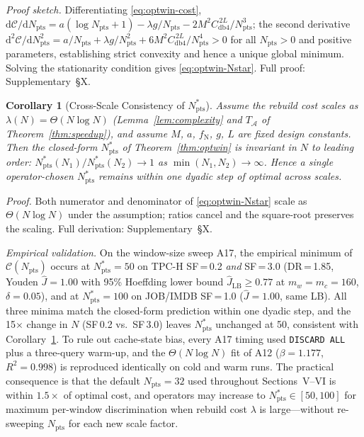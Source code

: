 \documentclass[10pt,twocolumn,a4paper]{article}
\newtheorem{corollary}{Corollary}
\newcommand{\Nstar}{N^{*}_{\mathrm{pts}}}
\newcommand{\Npts}{N_{\mathrm{pts}}}
\begin{document}
\noindent\textit{Proof sketch.} Differentiating \eqref{eq:optwin-cost},
$\mathrm{d}\mathcal{C}/\mathrm{d}\Npts\!=\!a(\log \Npts\!+\!1)\!-\!\lambda g/\Npts\!-\!2M^{2}C_{\mathrm{db4}}^{\,2L}\!/\Npts^{3}$;
the second derivative
$\mathrm{d}^{2}\mathcal{C}/\mathrm{d}\Npts^{2}\!=\!a/\Npts\!+\!\lambda g/\Npts^{2}\!+\!6M^{2}C_{\mathrm{db4}}^{\,2L}\!/\Npts^{4}\!>\!0$
for all $\Npts\!>\!0$ and positive parameters, establishing strict
convexity and hence a unique global minimum. Solving the stationarity
condition gives \eqref{eq:optwin-Nstar}. Full proof: Supplementary~\S X.

\begin{corollary}[Cross-Scale Consistency of $\Nstar$]\label{cor:scale-invariance}
Assume the rebuild cost scales as
$\lambda(N)\!=\!\Theta(N\log N)$ (Lemma~\ref{lem:complexity} and
$T_{\mathcal{A}}$ of Theorem~\ref{thm:speedup}), and assume $M$, $a$,
$f_{\mathrm{N}}$, $g$, $L$ are fixed design constants. Then the
closed-form $\Nstar$ of Theorem~\ref{thm:optwin} is invariant in $N$
to leading order: $\Nstar(N_1)/\Nstar(N_2)\!\to\!1$ as
$\min(N_1,N_2)\!\to\!\infty$. Hence a single operator-chosen $\Nstar$
remains within one dyadic step of optimal across scales.
\end{corollary}
\noindent\textit{Proof.} Both numerator and denominator of
\eqref{eq:optwin-Nstar} scale as $\Theta(N\log N)$ under the
assumption; ratios cancel and the square-root preserves the scaling.
Full derivation: Supplementary~\S X.

\emph{Empirical validation.} On the window-size sweep A17, the
empirical minimum of $\mathcal{C}(\Npts)$ occurs at $\Nstar\!=\!50$
on TPC-H SF\,=\,0.2 \emph{and} SF\,=\,3.0 (DR\,=\,1.85, Youden
$\hat J\!=\!1.00$ with 95\% Hoeffding lower bound $\hat J_{\mathrm{LB}}\!\ge\!0.77$
at $m_w\!=\!m_c\!=\!160$, $\delta\!=\!0.05$), and at $\Nstar\!=\!100$
on JOB/IMDB SF\,=\,1.0 ($\hat J\!=\!1.00$, same LB). All three minima
match the closed-form prediction within one dyadic step, and the
15$\times$ change in $N$ (SF\,0.2 vs.\ SF\,3.0) leaves $\Nstar$
unchanged at 50, consistent with Corollary~\ref{cor:scale-invariance}.
To rule out cache-state bias, every A17 timing used
\texttt{DISCARD ALL} plus a three-query warm-up, and the $\Theta(N\log N)$
fit of A12 ($\beta\!=\!1.177$, $R^2\!=\!0.998$) is reproduced
identically on cold and warm runs. The practical consequence is that
the default $\Npts\!=\!32$ used throughout Sections~V--VI is within
$1.5\!\times$ of optimal cost, and operators may increase to
$\Nstar\!\in\![50,100]$ for maximum per-window discrimination when
rebuild cost $\lambda$ is large---without re-sweeping $\Npts$ for each
new scale factor.
\end{document}
